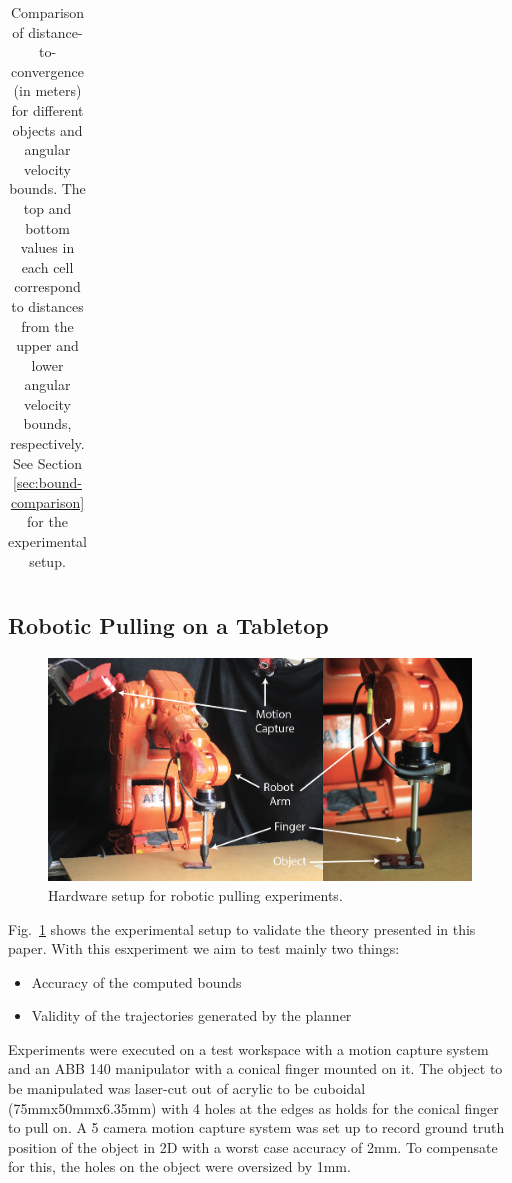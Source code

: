 \documentclass[conference]{IEEEtran}
\begin{document}
\begin{table}[t]
\begin{center}
\begin{tabular}[c]{cccc}
        \bottomrule
      \end{tabular}
  \end{center}
  \caption{Comparison of distance-to-convergence (in meters) for different objects and angular velocity bounds. The top and bottom values in each cell correspond to distances from the upper and lower angular velocity bounds, respectively. See Section \ref{sec:bound-comparison} for the experimental setup.}
  \label{table:convergence-distance}
\end{table}

\subsection{Robotic Pulling on a Tabletop}
\begin{figure}
\begin{center}
  \includegraphics[width=\columnwidth]{fig/hardware.png}
\end{center}
\caption{Hardware setup for robotic pulling experiments.}
\label{fig:hardware}
\end{figure}

Fig.~\ref{fig:hardware} shows the experimental setup to validate the theory presented in this paper. With this esxperiment we aim to test mainly two things: 
\begin{itemize}
  \item Accuracy of the computed bounds
  \item Validity of the trajectories generated by the planner
\end{itemize}

Experiments were executed on a test workspace with a motion capture system and an ABB 140 manipulator with a conical finger mounted on it. The object to be manipulated was laser-cut out of acrylic to be cuboidal (75mmx50mmx6.35mm) with 4 holes at the edges as holds for the conical finger to pull on. A 5 camera motion capture system was set up to record ground truth position of the object in 2D with a worst case accuracy of 2mm. To compensate for this, the holes on the object were oversized by 1mm.
\end{document}
